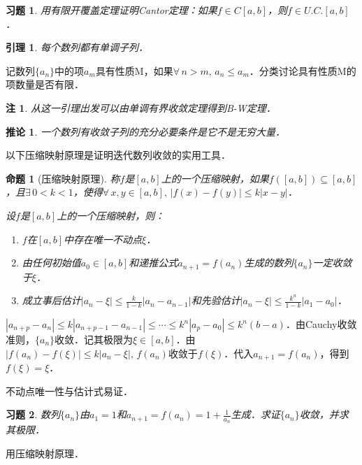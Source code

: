 \documentclass[11pt,a4paper]{ctexart}
\makeatletter
\theoremstyle{thmseries} %
\newtheorem{cor}{推论}[section]
\newtheorem{prop}{命题}[section]
\newtheorem{lem}{引理}[section]
\theoremstyle{exerseries}
\newtheorem{exer}{习题}[section]
\newtheorem*{rem}{注}
\renewenvironment{proof}[1][\proofname]{\par
  \pushQED{\qed}%
  \normalfont \topsep6\p@\@plus6\p@\relax
  \trivlist
  \item[\hskip\labelsep
        \itshape
    #1\@addpunct{}]\ignorespaces
}{%
  \popQED\endtrivlist\@endpefalse
}
\newenvironment{pf}{\begin{proof}[\bfseries\upshape 证\quad]}{\end{proof}}
\newcommand{\bra}[1]{\mathopen{}\left(#1\right)}
\makeatother
\begin{document}
\begin{exer}
	用有限开覆盖定理证明Cantor定理：如果$f\in C[a,b]$，则$f\in U.C.[a,b]$．
\end{exer}

\begin{lem}
	每个数列都有单调子列．
\end{lem}
\begin{pf}
	记数列$\{a_n\}$中的项$a_m$具有性质M，如果$\forall\,n>m,\,a_n\leq a_m$．分类讨论具有性质M的项数量是否有限．
\end{pf}
\begin{rem}
	从这一引理出发可以由单调有界收敛定理得到B-W定理．
\end{rem}

\begin{cor}
	一个数列有收敛子列的充分必要条件是它不是无穷大量．
\end{cor}

以下压缩映射原理是证明迭代数列收敛的实用工具．
\begin{prop}[压缩映射原理]
	称$f$是$[a,b]$上的一个压缩映射，如果$f\bra{[a,b]}\subseteq[a,b]$，且$\exists\,0<k<1$，使得$\forall\,x,y\in[a,b],\,|f(x)-f(y)|\leq k|x-y|$．

	设$f$是$[a,b]$上的一个压缩映射，则：
	\begin{enumerate}
		\item $f$在$[a,b]$中存在唯一不动点$\xi$．
		\item 由任何初始值$a_0\in[a,b]$和递推公式$a_{n+1}=f(a_n)$生成的数列$\{a_n\}$一定收敛于$\xi$．
		\item 成立事后估计$|a_n-\xi|\leq\frac{k}{1-k}|a_n-a_{n-1}|$和先验估计$|a_n-\xi|\leq\frac{k^n}{1-k}|a_1-a_0|$．
	\end{enumerate}
\end{prop}
\begin{pf}
	$|a_{n+p}-a_n|\leq k|a_{n+p-1}-a_{n-1}|\leq\cdots\leq k^n|a_p-a_0|\leq k^n(b-a)$．由Cauchy收敛准则，$\{a_n\}$收敛．记其极限为$\xi\in[a,b]$．由$|f(a_n)-f(\xi)|\leq k|a_n-\xi|,\,f(a_n)$收敛于$f(\xi)$．代入$a_{n+1}=f(a_n)$，得到$f(\xi)=\xi$．

	不动点唯一性与估计式易证．
\end{pf}

\begin{exer}
	数列$\{a_n\}$由$a_1=1$和$a_{n+1}=f(a_n)=1+\frac{1}{a_n}$生成．求证$\{a_n\}$收敛，并求其极限．
\end{exer}
\begin{pf}
	用压缩映射原理．
\end{pf}
\end{document}
